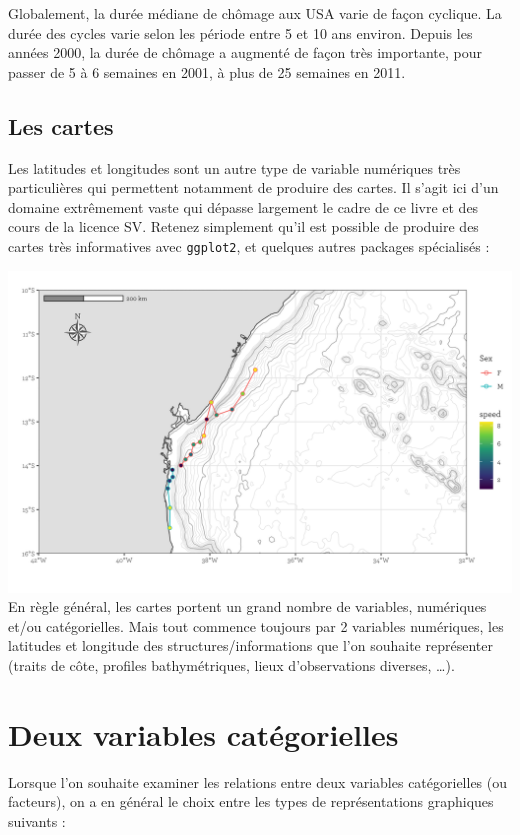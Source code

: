 \documentclass[
  a4paper,
  DIV=11,
  numbers=noendperiod,
  oneside]{scrreprt}
\begin{document}
Globalement, la durée médiane de chômage aux USA varie de façon
cyclique. La durée des cycles varie selon les période entre 5 et 10 ans
environ. Depuis les années 2000, la durée de chômage a augmenté de façon
très importante, pour passer de 5 à 6 semaines en 2001, à plus de 25
semaines en 2011.

\subsection{Les cartes}\label{les-cartes}

Les latitudes et longitudes sont un autre type de variable numériques
très particulières qui permettent notamment de produire des cartes. Il
s'agit ici d'un domaine extrêmement vaste qui dépasse largement le cadre
de ce livre et des cours de la licence SV. Retenez simplement qu'il est
possible de produire des cartes très informatives avec \texttt{ggplot2},
et quelques autres packages spécialisés :

\includegraphics{images/map.png} En règle général, les cartes portent un
grand nombre de variables, numériques et/ou catégorielles. Mais tout
commence toujours par 2 variables numériques, les latitudes et longitude
des structures/informations que l'on souhaite représenter (traits de
côte, profiles bathymétriques, lieux d'observations diverses, \ldots).

\section{Deux variables
catégorielles}\label{deux-variables-catuxe9gorielles}

Lorsque l'on souhaite examiner les relations entre deux variables
catégorielles (ou facteurs), on a en général le choix entre les types de
représentations graphiques suivants :
\end{document}
